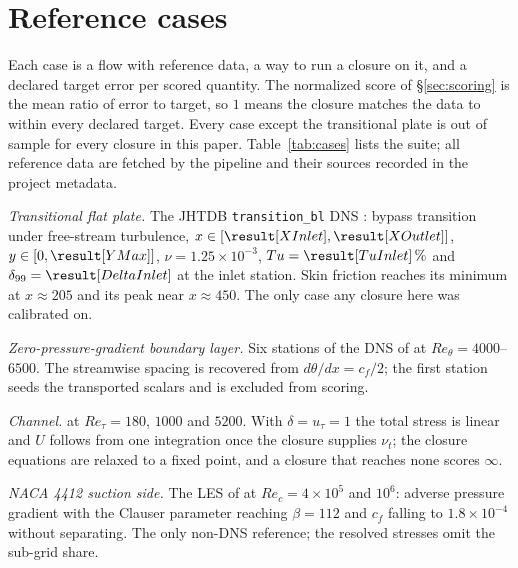 \documentclass[lineno]{jfm}
\begin{document}
\section{Reference cases}\label{sec:cases}

Each case is a flow with reference data, a way to run a closure on it, and a
declared target error per scored quantity. The normalized score of
\S\ref{sec:scoring} is the mean ratio of error to target, so $1$ means the
closure matches the data to within every declared target. Every case except
the transitional plate is out of sample for every closure in this paper.
Table~\ref{tab:cases} lists the suite; all reference data are fetched by the
pipeline and their sources recorded in the project metadata.

\begin{table}
  \begin{center}
  \footnotesize
  \casesTable
  \caption{The reference cases. ``Fast'' cases run in the parabolic or
    exact-formulation Python solver, ``OpenFOAM'' cases in
    \texttt{simpleFoam}. Aft quantities on the NACA 4412 are scored near
    the trailing edge.}
  \label{tab:cases}
  \end{center}
\end{table}

\emph{Transitional flat plate.} The JHTDB \texttt{transition\_bl} DNS
\citep{JHTDBDescription, Zaki2013}: bypass transition under free-stream
turbulence, $x \in [\result[XInlet], \result[XOutlet]]$,
$y \in [0, \result[YMax]]$, $\nu = 1.25\times10^{-3}$, $Tu = \result[TuInlet]\,\%$
and $\delta_{99} = \result[DeltaInlet]$ at the inlet station. Skin friction
reaches its minimum at $x \approx 205$ and its peak near $x \approx 450$. The
only case any closure here was calibrated on.

\emph{Zero-pressure-gradient boundary layer.} Six stations of the DNS of
\citet{Sillero2013} at $Re_\theta = 4000$--$6500$. The streamwise spacing is
recovered from $d\theta/dx = c_f/2$; the first station seeds the transported
scalars and is excluded from scoring.

\emph{Channel.} \citet{LeeMoser2015} at $Re_\tau = 180$, $1000$ and $5200$.
With $\delta = u_\tau = 1$ the total stress is linear and $U$ follows from
one integration once the closure supplies $\nu_t$; the closure equations are
relaxed to a fixed point, and a closure that reaches none scores $\infty$.

\emph{NACA 4412 suction side.} The LES of \citet{Vinuesa2018} at
$Re_c = 4\times10^5$ and $10^6$: adverse pressure gradient with the Clauser
parameter reaching $\beta = 112$ and $c_f$ falling to $1.8\times10^{-4}$
without separating. The only non-DNS reference; the resolved stresses omit
the sub-grid share.
\end{document}

